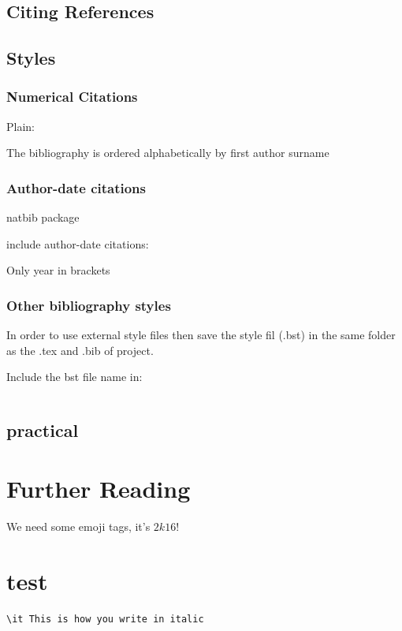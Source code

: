 \documentclass[a4paper,12pt]{article}
\begin{document}
\subsection{Citing References}

\subsection{Styles}
\subsubsection{Numerical Citations}
Plain:

The bibliography is ordered alphabetically by first author surname

\subsubsection{Author-date citations}
natbib package

include author-date citations:
\citep{Connollyetal2016}

Only year in brackets
\citet{Connollyetal2016}

\subsubsection{Other bibliography styles}
In order to use external style files then save the style fil (.bst) in the same folder as the .tex and .bib of project.

Include the bst file name in:
\begin{verbatim}

\end{verbatim}


\subsection{practical}

\section{Further Reading}
We need some emoji tags, it's $2k16!$

{\huge \color{cyan}{\LaTeX}}

\section{test}

\begin{verbatim}
\it This is how you write in italic
\end{verbatim}

{}

%
%
%
%
\end{document}
